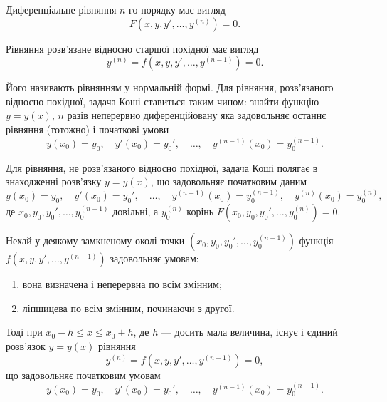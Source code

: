 Диференціальне рівняння $n$-го порядку має вигляд
\begin{equation*}
	F \left( x, y, y', \ldots, y^{(n)} \right) = 0.
\end{equation*}

Рівняння розв'язане відносно старшої похідної має вигляд
\begin{equation*}
	y^{(n)} = f \left( x, y, y', \ldots, y^{(n-1)} \right) = 0.
\end{equation*}

Його називають рівнянням у нормальній формі. Для рівняння, роз\-в'яз\-а\-но\-го відносно похідної, задача Коші ставиться таким чином: знайти функцію $y = y(x)$, $n$ разів неперервно диференційовану яка задовольняє останнє рівняння (тотожно) і початкові умови
\begin{equation*}
	y(x_0) = y_0, \quad y'(x_0) = y_0', \quad \ldots, \quad y^{(n - 1)} (x_0) = y_0^{(n-1)}.
\end{equation*}

Для рівняння, не розв'язаного відносно похідної, задача Коші полягає в знаходженні розв'язку $y = y(x)$, що задовольняє початковим даним 
\begin{equation*}
	y(x_0) = y_0, \quad y'(x_0) = y_0', \quad \ldots, \quad y^{(n - 1)} (x_0) = y_0^{(n-1)}, \quad y^{(n)} (x_0) = y_0^{(n)},
\end{equation*}
де $x_0, y_0, y_0', \ldots, y_0^{(n-1)}$ довільні, а $y_0^{(n)}$ корінь $F \left( x_0, y_0, y_0', \ldots, y_0^{(n)} \right) = 0$.

\begin{theorem}
	Нехай у деякому замкненому околі точки $\left(x_0, y_0, y_0', \ldots, y_0^{(n-1)}\right)$ функція $f\left(x,y,y',\ldots,y^{(n-1)}\right)$ задовольняє умовам:
	\begin{enumerate}
		\item вона визначена і неперервна по всім змінним;
		\item ліпшицева по всім змінним, починаючи з другої.
	\end{enumerate}
	
	Тоді при $x_0 - h \le x \le x_0 + h$, де $h$ --- досить мала величина, існує і єдиний розв'язок $y=y(x)$ рівняння
		\begin{equation*}
		y^{(n)} = f \left( x, y, y', \ldots, y^{(n-1)} \right) = 0,
	\end{equation*}
	що задовольняє початковим умовам 
	\begin{equation*}
		y(x_0) = y_0, \quad y'(x_0) = y_0', \quad \ldots, \quad y^{(n - 1)} (x_0) = y_0^{(n-1)}.
	\end{equation*}
\end{theorem}

